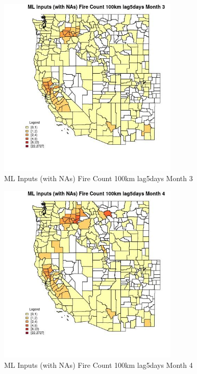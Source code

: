 \begin{figure} 
\centering  
\includegraphics[width=0.77\textwidth]{Code_Outputs/Report_ML_input_PM25_Step4_part_f_de_duplicated_aveswNAs_CountyFire_Count_100km_lag5daysmedianMonth3.jpg} 
\caption{\label{fig:Report_ML_input_PM25_Step4_part_f_de_duplicated_aveswNAsCountyFire_Count_100km_lag5daysmedianMonth3}ML Inputs (with NAs) Fire Count 100km lag5days Month 3} 
\end{figure} 
 

\begin{figure} 
\centering  
\includegraphics[width=0.77\textwidth]{Code_Outputs/Report_ML_input_PM25_Step4_part_f_de_duplicated_aveswNAs_CountyFire_Count_100km_lag5daysmedianMonth4.jpg} 
\caption{\label{fig:Report_ML_input_PM25_Step4_part_f_de_duplicated_aveswNAsCountyFire_Count_100km_lag5daysmedianMonth4}ML Inputs (with NAs) Fire Count 100km lag5days Month 4} 
\end{figure} 
 

